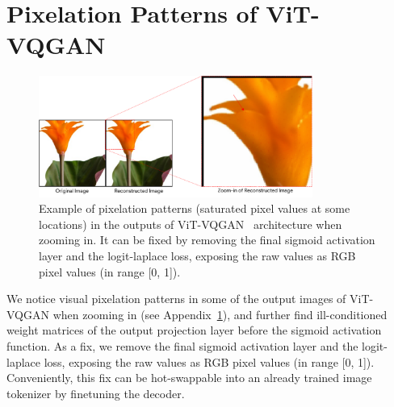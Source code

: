 \section{Pixelation Patterns of ViT-VQGAN} \label{secs:appendix_pixelation}

\begin{figure}[!ht]
\centering
\includegraphics[width=0.8\textwidth]{figures/pixelation.pdf}
\caption{Example of pixelation patterns (saturated pixel values at  some locations) in the outputs of ViT-VQGAN~\cite{yu2021vector} architecture when zooming in. It can be fixed by removing the final sigmoid activation layer and the logit-laplace loss, exposing the raw values as RGB pixel values (in range [0, 1]).}
\label{figs:pixelation}
\end{figure}

We notice visual pixelation patterns in some of the output images of ViT-VQGAN when zooming in (see Appendix~\ref{secs:appendix_pixelation}), and further find ill-conditioned weight matrices of the output projection layer before the sigmoid activation function. As a fix, we remove the final sigmoid activation layer and the logit-laplace loss, exposing the raw values as RGB pixel values (in range [0, 1]). Conveniently, this fix can be hot-swappable into an already trained image tokenizer by finetuning the decoder.